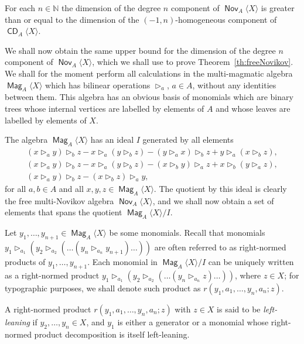 \documentclass[AHL,Unicode,longabstracts]{cedram}
\newcommand{\bbN}{\mathbb{N}}
\DeclareMathOperator{\CDi}{\mathsf{CD}}
\DeclareMathOperator{\Nov}{\mathsf{Nov}}
\DeclareMathOperator{\Mag}{\mathsf{Mag}}
\begin{document}
\begin{corollary}\label{lower_bound}
For each $n\in\bbN$ the dimension of the degree $n$ component of $\Nov_A\langle X\rangle$ is greater than or equal to the dimension of the $(-1,n)$-homogeneous component of $\CDi_A\langle X\rangle$.
\end{corollary}

We shall now obtain the same upper bound for the dimension of the degree $n$ component of $\Nov_A\langle X\rangle$, which we shall use to prove Theorem~\ref{th:freeNovikov}. We shall for the moment perform all calculations in the multi-magmatic algebra $\Mag_A\langle X\rangle$ which has bilinear operations $\triangleright_a$, $a\in A$, without any identities between them. This algebra has an obvious basis of monomials which are binary trees whose internal vertices are labelled by elements of $A$ and whose leaves are labelled by elements of $X$.

The algebra $\Mag_A\langle X\rangle$ has an ideal $I$ generated by all elements
\begin{gather}
(x \triangleright_a y) \triangleright_b z - x \triangleright_a (y \triangleright_b z) - (y \triangleright_a x) \triangleright_b z + y \triangleright_a (x \triangleright_b z),
\\ (x \triangleright_a y) \triangleright_b z - x \triangleright_a (y \triangleright_b z) - (x\triangleright_b y) \triangleright_a z + x \triangleright_b (y \triangleright_a z),
\\ (x \triangleright_a y) \triangleright_b z - (x \triangleright_b z)\triangleright_a y,
\end{gather}
for all $ a,b\in A$ and all $x,y,z\in \Mag_A\langle X\rangle$. The quotient by this ideal is clearly the free multi-Novikov algebra $\Nov_A\langle X\rangle$, and we shall now obtain a set of elements that spans the quotient $\Mag_A\langle X\rangle/I$.

Let $y_1,\dots,y_{n+1}\in \Mag_A\langle X\rangle$ be some monomials. Recall that monomials $y_1\triangleright_{a_1} (y_2\triangleright_{a_2} (\dots (y_n\triangleright_{a_n} y_{n+1}) \dots))$ are often referred to as right-normed products of $y_1,\dots,y_{n+1}$. Each monomial in $\Mag_A\langle X\rangle/I$ can be uniquely written as a right-normed product $y_1\triangleright_{a_1} (y_2\triangleright_{a_2} (\dots (y_n\triangleright_{a_n} z) \dots))$, where $z\in X$; for typographic purposes, we shall denote such product as $r(y_1,a_1,\dots,y_n,a_n;z)$.

\begin{defi}\label{leaning}
A right-normed product $r(y_1,a_1,\dots,y_n,a_n;z)$ with $z\in X$ is said to be \emph{left-leaning} if $y_2,\dots,y_n\in X$, and $y_{1}$ is either a generator or a monomial whose right-normed product decomposition is itself left-leaning.
\end{defi}
\end{document}
